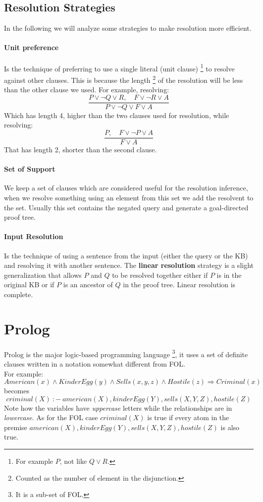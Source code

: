 \documentclass[10pt,a4paper]{article}
\begin{document}
\subsection{Resolution Strategies}
In the following we will analyze some strategies to make resolution more efficient.

\paragraph{Unit preference} Is the technique of preferring to use a single literal (unit clause) \footnote{For example $P$, not like $Q\vee R$.} to resolve against other clauses. This is because the length \footnote{Counted as the number of element in the disjunction.} of the resolution will be less than the other clause we used. For example, resolving:
\[\frac{P\vee \neg Q \vee R,\quad  F \vee \neg R \vee A}{P\vee \neg Q\vee F \vee A}\]
Which has length 4, higher than the two clauses used for resolution, while resolving:
\[\frac{P,\quad  F \vee \neg P \vee A}{ F \vee A}\]
That has length 2, shorter than the second clause.

\paragraph{Set of Support} We keep a set of clauses which are considered useful for the resolution inference, when we resolve something using an element from this set we add the resolvent to the set. Usually this set contains the negated query and generate a goal-directed proof tree.


\paragraph{Input Resolution} Is the technique of using a sentence from the input (either the query or the KB) and resolving it with another sentence. The \textbf{linear resolution} strategy is a slight generalization that allows $P$ and $Q$ to be resolved together either if $P$ is in the original KB or if $P$ is an ancestor of $Q$ in the proof tree. Linear resolution is complete.











\newpage


\section{Prolog}
Prolog is the major logic-based programming language \footnote{It is a sub-set of FOL.}, it uses a set of definite clauses written in a notation somewhat different from FOL.\\ 
For example:
\[American(x)\wedge KinderEgg(y)\wedge Sells(x,y,z)\wedge Hostile(z)\Rightarrow Criminal(x)\]
becomes
\[criminal(X)\ :-\ american(X), kinderEgg(Y), sells(X,Y,Z), hostile(Z)\]
Note how the variables have \textit{uppercase} letters while the relationships are in \textit{lowercase}. As for the FOL case $criminal(X)$ is true if every atom in the premise $american(X), kinderEgg(Y), sells(X,Y,Z), hostile(Z)$ is also true.\\
\end{document}

